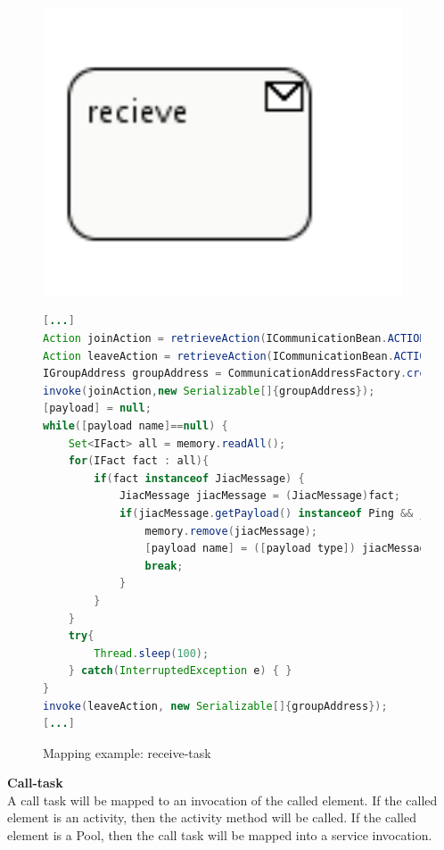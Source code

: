 \begin{figure}[h]
\begin{minipage}[c]{0.3\textwidth}
\includegraphics[width=0.95\textwidth]{images/mapping/receiveTask.png}
\end{minipage}
\begin{minipage}[c]{0.7\textwidth}
\begin{lstlisting}[language=Java]
[...]
Action joinAction = retrieveAction(ICommunicationBean.ACTION_JOIN_GROUP);
Action leaveAction = retrieveAction(ICommunicationBean.ACTION_LEAVE_GROUP);
IGroupAddress groupAddress = CommunicationAddressFactory.createGroupAddress([address]);
invoke(joinAction,new Serializable[]{groupAddress});
[payload] = null;
while([payload name]==null) {
	Set<IFact> all = memory.readAll();
	for(IFact fact : all){
		if(fact instanceof JiacMessage) {
			JiacMessage jiacMessage = (JiacMessage)fact;
			if(jiacMessage.getPayload() instanceof Ping && jiacMessage.getHeader(IJiacMessage.Header.SEND_TO).equals(groupAddress)) {
				memory.remove(jiacMessage);
				[payload name] = ([payload type]) jiacMessage.getPayload();
				break;
			}
		}
	}
	try{
		Thread.sleep(100);
	} catch(InterruptedException e) { }
}
invoke(leaveAction, new Serializable[]{groupAddress});
[...]
\end{lstlisting}
\end{minipage}
\caption{Mapping example: receive-task}%
\label{fig:receive_task}%
\end{figure}

\textbf{Call-task}\\
A call task will be mapped to an invocation of the called element. If the called element is an activity, then the activity method will be called. 
If the called element is a Pool, then the call task will be mapped into a service invocation. 

